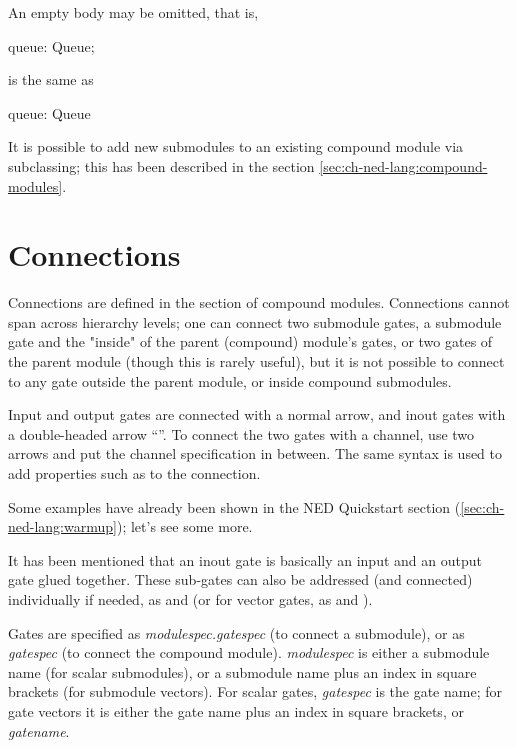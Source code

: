 An empty body may be omitted, that is,

\begin{ned}
      queue: Queue;
\end{ned}

is the same as

\begin{ned}
      queue: Queue {
      }
\end{ned}

It is possible to add new submodules to an existing compound module via
subclassing; this has been described in the section
\ref{sec:ch-ned-lang:compound-modules}.



\section{Connections}
\label{sec:ch-ned-lang:connections}

Connections are defined in the  section of compound
modules. Connections cannot span across hierarchy levels; one can connect
two submodule gates, a submodule gate and the "inside" of the parent
(compound) module's gates, or two gates of the parent module (though this
is rarely useful), but it is not possible to connect to any gate outside the
parent module, or inside compound submodules.

Input and output gates are connected with a normal arrow, and inout gates
with a double-headed arrow ``\ttt{<-{}->}''. To connect the two gates
with a channel, use two arrows and put the channel specification in between.
The same syntax is used to add properties such as  to the
connection.

Some examples have already been shown in the NED Quickstart section
(\ref{sec:ch-ned-lang:warmup}); let's see some more.



It has been mentioned that an inout gate is basically an input and an
output gate glued together. These sub-gates can also be addressed (and
connected) individually if needed, as  and  (or
for vector gates, as  and ).



Gates are specified as \textit{modulespec.gatespec} (to connect a submodule),
or as \textit{gatespec} (to connect the compound module). \textit{modulespec}
is either a submodule name (for scalar submodules), or a submodule name plus
an index in square brackets (for submodule vectors). For scalar gates,
\textit{gatespec} is the gate name; for gate vectors it is either the gate name
plus an index in square brackets, or \textit{gatename}\ttt{++}.

